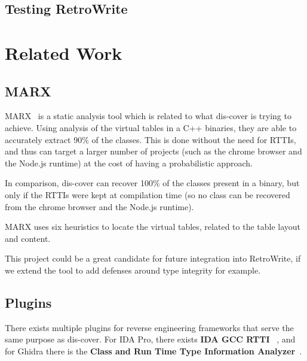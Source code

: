 \documentclass[a4paper,11pt,oneside]{report}
\begin{document}
\section{Testing RetroWrite}


\chapter{Related Work}



\section{MARX}
\label{relatedworksmarx}

MARX~\cite{marx} is a static analysis tool which is related to what dis-cover
is trying to achieve. Using analysis of the virtual tables in a C++ binaries,
they are able to accurately extract 90\% of the classes. This is done without
the need for RTTIs, and thus can target a larger number of projects (such as
the chrome browser and the Node.js runtime) at the cost of having a
probabilistic approach.

In comparison, dis-cover can recover 100\% of the classes present in a binary,
but only if the RTTIs were kept at compilation time (so no class can be
recovered from the chrome browser and the Node.js runtime).

MARX uses six heuristics to locate the virtual tables, related to the table
layout and content.

This project could be a great candidate for future integration into
RetroWrite, if we extend the tool to add defenses around type integrity for
example.

\section{Plugins}

There exists multiple plugins for reverse engineering frameworks that serve
the same purpose as dis-cover. For IDA Pro, there exists \textbf{IDA GCC RTTI}
~\cite{idagccrtti}, and for Ghidra there is the \textbf{Class and Run Time
Type Information Analyzer}~\cite{ghidracppclassanalyzer}.
\end{document}
